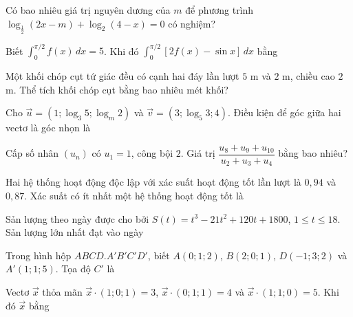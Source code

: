 \begin{ex}
Có bao nhiêu giá trị nguyên dương của $m$ để phương trình
$\log_{\frac12}(2x-m)+\log_2(4-x)=0$ có nghiệm?
\end{ex}

\begin{ex}
Biết $\displaystyle\int_0^{\pi/2}f(x)\,dx=5$. Khi đó
$\displaystyle\int_0^{\pi/2}[2f(x)-\sin x]\,dx$ bằng
\end{ex}

\begin{ex}
Một khối chóp cụt tứ giác đều có cạnh hai đáy lần lượt $5$ m và $2$ m, chiều cao $2$ m. Thể tích khối chóp cụt bằng bao nhiêu mét khối?
\end{ex}

\begin{ex}
Cho $\vec u=(1;\log_3 5;\log_m2)$ và $\vec v=(3;\log_5 3;4)$. Điều kiện để góc giữa hai vectơ là góc nhọn là
\end{ex}

\begin{ex}
Cấp số nhân $(u_n)$ có $u_1=1$, công bội $2$. Giá trị
$\dfrac{u_8+u_9+u_{10}}{u_2+u_3+u_4}$ bằng bao nhiêu?
\end{ex}

\begin{ex}
Hai hệ thống hoạt động độc lập với xác suất hoạt động tốt lần lượt là $0{,}94$ và $0{,}87$. Xác suất có ít nhất một hệ thống hoạt động tốt là
\end{ex}

\begin{ex}
Sản lượng theo ngày được cho bởi $S(t)=t^3-21t^2+120t+1800$, $1\le t\le18$. Sản lượng lớn nhất đạt vào ngày
\end{ex}

\begin{ex}
Trong hình hộp $ABCD.A'B'C'D'$, biết $A(0;1;2)$, $B(2;0;1)$, $D(-1;3;2)$ và $A'(1;1;5)$. Tọa độ $C'$ là
\end{ex}

\begin{ex}
Vectơ $\vec x$ thỏa mãn $\vec x\cdot(1;0;1)=3$, $\vec x\cdot(0;1;1)=4$ và $\vec x\cdot(1;1;0)=5$. Khi đó $\vec x$ bằng
\end{ex}

